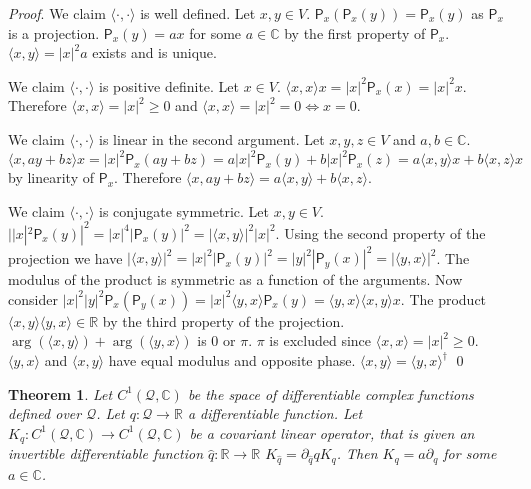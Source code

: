 \documentclass[smallextended]{svjour3}
\numberwithin{equation}{section}
\renewenvironment{proof}{\emph{Proof}.}{\hfill\(\qed\)}
\newtheorem{thrm}[equation]{Theorem}
\theoremstyle{definition}
\renewenvironment{proof}{\emph{Proof}.}{\qed}
\begin{document}
\begin{proof}
	We claim $\langle \cdot , \cdot \rangle$ is well defined. Let $x, y \in V$. $\mathsf{P}_x (\mathsf{P}_x (y)) =\mathsf{P}_x(y)$ as $\mathsf{P}_x$ is a projection. $\mathsf{P}_x(y) = a x $ for some $a \in \mathbb{C}$ by the first property of $\mathsf{P}_x$. $\langle x , y \rangle = |x|^2 a$ exists and is unique. 
	
	We claim $\langle \cdot , \cdot \rangle$ is positive definite. Let $x \in V$. $\langle x , x \rangle x = |x|^2 \mathsf{P}_x(x) = |x|^2 x $. Therefore $\langle x , x \rangle = |x|^2 \ge 0$ and $\langle x , x \rangle = |x|^2 = 0 \Leftrightarrow x = 0$.
	
	We claim $\langle \cdot , \cdot \rangle$ is linear in the second argument. Let $x,y,z \in V$ and $a,b \in \mathbb{C}$. $\langle x , a y + b z \rangle x = |x|^2 \mathsf{P}_x(a y + b z)=a  |x|^2 \mathsf{P}_x(y) + b  |x|^2 \mathsf{P}_x(z) = a \langle x , y \rangle x + b \langle x, z \rangle x$ by linearity of $\mathsf{P}_x$. Therefore $\langle x , a y + b z \rangle = a \langle x , y \rangle + b \langle x, z \rangle$.
	
	We claim $\langle \cdot , \cdot \rangle$ is conjugate symmetric. Let $x,y \in V$. $ | |x|^2\mathsf{P}_x(y)|^2 = |x|^4|\mathsf{P}_x(y)|^2 = |\langle x , y \rangle|^2 |x|^2$. Using the second property of the projection we have $|\langle x , y \rangle|^2 = |x|^2|\mathsf{P}_x(y)|^2 =  |y|^2|\mathsf{P}_y(x)|^2 = |\langle y , x \rangle|^2$. The modulus of the product is symmetric as a function of the arguments. Now consider $|x|^2|y|^2\mathsf{P}_x(\mathsf{P}_y(x)) = |x|^2 \langle y , x \rangle \mathsf{P}_x(y) = \langle y , x \rangle \langle x , y \rangle x$. The product $\langle x , y \rangle \langle y , x \rangle \in \mathbb{R}$ by the third property of the projection. $\arg(\langle x , y \rangle) + \arg(\langle y , x \rangle)$ is $0$ or $\pi$. $\pi$ is excluded since $\langle x , x \rangle = |x|^2 \ge 0$. $\langle y , x \rangle$ and $\langle x , y \rangle$ have equal modulus and opposite phase. $\langle x , y \rangle = \langle y , x \rangle^\dagger$
\end{proof}

\begin{thrm}\label{thrm:covariant_operator}
	Let $C^1(\mathcal{Q}, \mathbb{C})$ be the space of differentiable complex functions defined over $\mathcal{Q}$. Let $q : \mathcal{Q} \rightarrow \mathbb{R}$ a differentiable function. Let $K_q : C^1(\mathcal{Q}, \mathbb{C}) \rightarrow C^1(\mathcal{Q}, \mathbb{C})$ be a covariant linear operator, that is given an invertible differentiable function $\hat{q} : \mathbb{R} \rightarrow \mathbb{R}$ $K_{\hat{q}} = \partial_{\hat{q}} q K_{q}$. Then $K_q = a \partial_q$ for some $a \in \mathbb{C}$.
\end{thrm}
\end{document}
